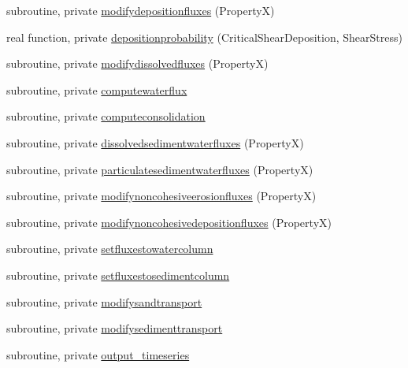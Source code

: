 \begin{DoxyCompactItemize}
subroutine, private \mbox{\hyperlink{namespacemoduleinterfacesedimentwater_a5d9003ebb144c9e66fe6235c416ea685}{modifydepositionfluxes}} (PropertyX)
\item 
real function, private \mbox{\hyperlink{namespacemoduleinterfacesedimentwater_a0e44cb6bef52ac05cfb4ad24e8715a5d}{depositionprobability}} (Critical\+Shear\+Deposition, Shear\+Stress)
\item 
subroutine, private \mbox{\hyperlink{namespacemoduleinterfacesedimentwater_ac7453c783a3170a319fb2e8f0bc6af3b}{modifydissolvedfluxes}} (PropertyX)
\item 
subroutine, private \mbox{\hyperlink{namespacemoduleinterfacesedimentwater_a53be621f24e2efe413055d68cd165ba9}{computewaterflux}}
\item 
subroutine, private \mbox{\hyperlink{namespacemoduleinterfacesedimentwater_a488a986c36aca3233969de75a2e2094e}{computeconsolidation}}
\item 
subroutine, private \mbox{\hyperlink{namespacemoduleinterfacesedimentwater_a892fef59c88570196d680f581deef4a9}{dissolvedsedimentwaterfluxes}} (PropertyX)
\item 
subroutine, private \mbox{\hyperlink{namespacemoduleinterfacesedimentwater_a1ea77fd3a708c35c8d23bb864a94a0ad}{particulatesedimentwaterfluxes}} (PropertyX)
\item 
subroutine, private \mbox{\hyperlink{namespacemoduleinterfacesedimentwater_a3ed9cede4da99e95712c02f4a8a6408a}{modifynoncohesiveerosionfluxes}} (PropertyX)
\item 
subroutine, private \mbox{\hyperlink{namespacemoduleinterfacesedimentwater_a9d8d2c2895ffd32b4cc15bfff20e9f7f}{modifynoncohesivedepositionfluxes}} (PropertyX)
\item 
subroutine, private \mbox{\hyperlink{namespacemoduleinterfacesedimentwater_a9c3a165d2ddf84d84404172f34db61ab}{setfluxestowatercolumn}}
\item 
subroutine, private \mbox{\hyperlink{namespacemoduleinterfacesedimentwater_a1493bc1b914a1c9424edba0cd5747eef}{setfluxestosedimentcolumn}}
\item 
subroutine, private \mbox{\hyperlink{namespacemoduleinterfacesedimentwater_acec4b1c4e1750f68a29c778c4dff4dad}{modifysandtransport}}
\item 
subroutine, private \mbox{\hyperlink{namespacemoduleinterfacesedimentwater_af8d259ce72d65a152ca86349e82463f1}{modifysedimenttransport}}
\item 
subroutine, private \mbox{\hyperlink{namespacemoduleinterfacesedimentwater_a8768df3235fac76ac345a9a68b7e7437}{output\+\_\+timeseries}}

\end{DoxyCompactItemize}
